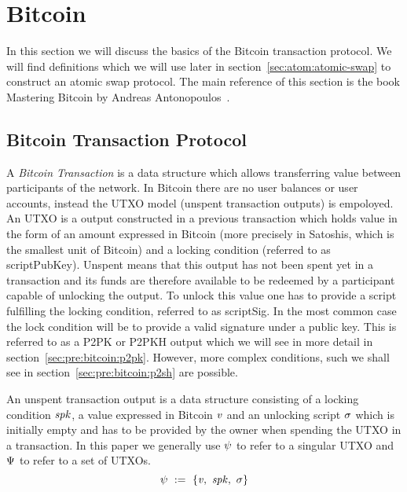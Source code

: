\section{Bitcoin} \label{sec:pre:bitcoin}

In this section we will discuss the basics of the Bitcoin transaction protocol.
We will find definitions which we will use later in section~\ref{sec:atom:atomic-swap} to construct an atomic swap protocol.
The main reference of this section is the book Mastering Bitcoin by Andreas Antonopoulos~\cite{antonopoulos2014mastering}.

\subsection{Bitcoin Transaction Protocol}\label{subsec:pre:bitcointx}

A \emph{Bitcoin Transaction} is a data structure which allows transferring value between participants of the network.
In Bitcoin there are no user balances or user accounts, instead the UTXO model (unspent transaction outputs) is empoloyed.
An UTXO is a output constructed in a previous transaction which holds value in the form of an amount expressed in
Bitcoin (more precisely in Satoshis, which is the smallest unit of Bitcoin) and a locking condition (referred to as
scriptPubKey).
Unspent means that this output has not been spent yet in a transaction and its funds are therefore available to be redeemed by a participant capable of unlocking the output.
To unlock this value one has to provide a script fulfilling the locking condition, referred to as scriptSig.
In the most common case the lock condition will be to provide a valid signature under a public key.
This is referred to as a P2PK or P2PKH output which we will see in more detail in section~\ref{sec:pre:bitcoin:p2pk}.
However, more complex conditions, such we shall see in section~\ref{sec:pre:bitcoin:p2sh} are possible.

\begin{definition} An unspent transaction output is a data structure
consisting of a locking condition $\mathit{spk}$, a value expressed in Bitcoin $\mathit{v}$ and an unlocking script $\mathit{\sigma}$ which is
initially empty and has to be provided by the owner when spending the UTXO in a transaction. In this paper we
generally use $\psi$ to refer to a singular UTXO and $\Psi$ to refer to a set of UTXOs.
    \[ \psi ~:=~ \{ \mathit{v} ,~ \mathit{spk} ,~ \mathit{\sigma} \} \]
\end{definition}

